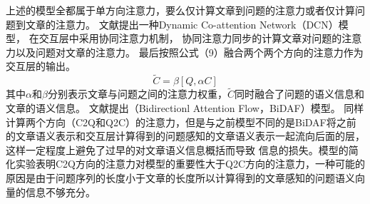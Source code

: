
上述的模型全都属于单方向注意力，要么仅计算文章到问题的注意力或者仅计算问题到文章的注意力。
文献\cite{DCN}提出一种Dynamic Co-attention Network（DCN）模型，
在交互层中采用协同注意力机制，
协同注意力同步的计算文章对问题的注意力以及问题对文章的注意力。
最后按照公式（9）融合两个两个方向的注意力作为交互层的输出。
\begin{equation}
\widetilde{C}=\beta[Q,\alpha C]
\end{equation}
其中$\alpha$和$\beta$分别表示文章与问题之间的注意力权重，$\widetilde{C}$同时融合了问题的语义信息和文章的语义信息。
文献\cite{BiDAF}提出（Bidirectionl Attention Flow，BiDAF）模型。
同样计算两个方向（C2Q和Q2C）的注意力，但是与之前模型不同的是BiDAF将之前的文章语义表示和交互层计算得到的问题感知的文章语义表示一起流向后面的层，这样一定程度上避免了过早的对文章语义信息概括而导致
信息的损失。模型的简化实验表明C2Q方向的注意力对模型的重要性大于Q2C方向的注意力，一种可能的原因是由于问题序列的长度小于文章的长度所以计算得到的文章感知的问题语义向量的信息不够充分。





